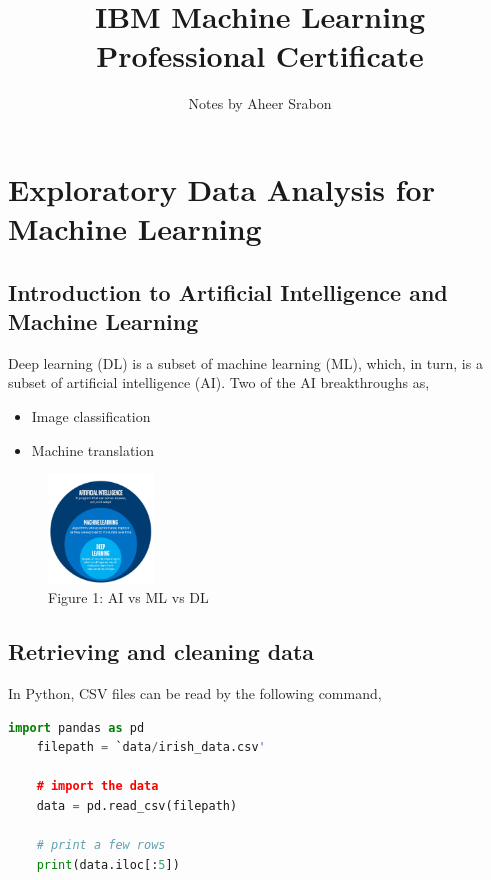 \documentclass{article}
\date{}
\title{IBM Machine Learning Professional Certificate}
\author{Notes by Aheer Srabon}
\theoremstyle{mytheoremstyle}
\theoremstyle{mytheoremstyle}
\theoremstyle{myproblemstyle}
\begin{document}
    \maketitle
    \section{Exploratory Data Analysis for Machine Learning}
    \subsection{Introduction to Artificial Intelligence and Machine Learning}

    \noindent Deep learning (DL) is a subset of machine learning (ML),
    which, in turn, is a subset of artificial intelligence (AI). Two of the
    AI breakthroughs as,
    \begin{itemize}
    	\item Image classification
	\item Machine translation
    \end{itemize}

    \begin{figure}[htp]
	\centering
	\includegraphics[width=0.25\textwidth]{../assets/AI_ML_DL.png}
    	\caption{Figure 1: AI vs ML vs DL}\label{fig:1}
    \end{figure}

    \subsection{Retrieving and cleaning data}
    \noindent In Python, CSV files can be read by the following command,

    \begin{lstlisting}[language=Python]
    import pandas as pd
    filepath = `data/irish_data.csv'

    # import the data
    data = pd.read_csv(filepath)

    # print a few rows
    print(data.iloc[:5])
    \end{lstlisting}

    \vspace{1cm}
\end{document}
